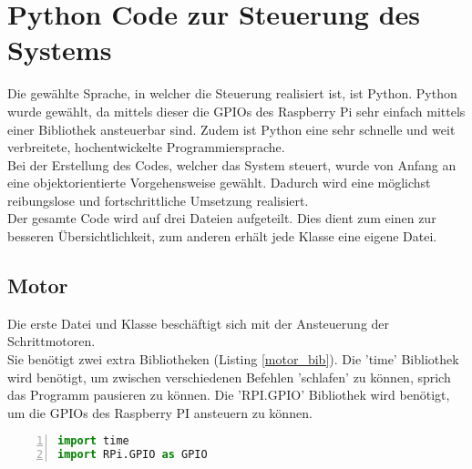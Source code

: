 
\chapter{Python Code zur Steuerung des Systems}\label{chap:code}
Die gewählte Sprache, in welcher die Steuerung realisiert ist, ist Python. Python wurde gewählt, da mittels dieser die \acp{GPIO} des Raspberry Pi sehr einfach mittels einer Bibliothek ansteuerbar sind. Zudem ist Python eine sehr schnelle und weit verbreitete, hochentwickelte Programmiersprache.\\
Bei der Erstellung des Codes, welcher das System steuert, wurde von Anfang an eine objektorientierte Vorgehensweise gewählt. Dadurch wird eine möglichst reibungslose und fortschrittliche Umsetzung realisiert.\\
Der gesamte Code wird auf drei Dateien aufgeteilt. Dies dient zum einen zur besseren Übersichtlichkeit, zum anderen erhält jede Klasse eine eigene Datei.
\section{Motor}
Die erste Datei und Klasse beschäftigt sich mit der Ansteuerung der Schrittmotoren.\\
Sie benötigt zwei extra Bibliotheken (Listing \ref{motor_bib}). Die 'time' Bibliothek wird benötigt, um zwischen verschiedenen Befehlen 'schlafen' zu können, sprich das Programm pausieren zu können. Die 'RPI.GPIO' Bibliothek wird benötigt, um die \acp{GPIO} des Raspberry PI ansteuern zu können. 
\begin{lstlisting}[caption={Bibliotheken der Motor Klasse}, language={Python}, label={motor_bib}, numbers=left]
import time
import RPi.GPIO as GPIO	
\end{lstlisting}

